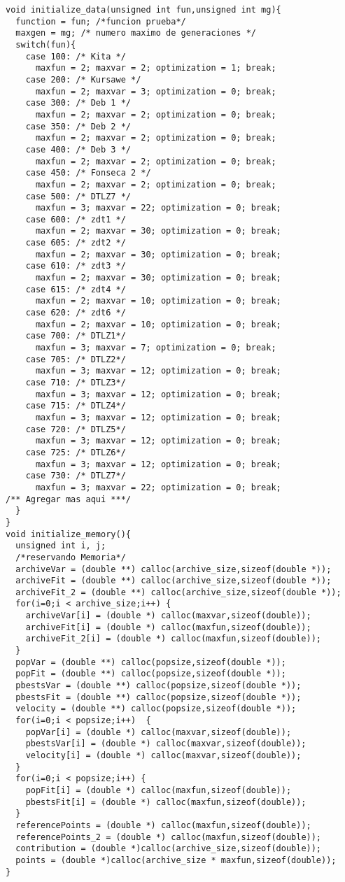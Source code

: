 \begin{lstlisting}[style=C]
void initialize_data(unsigned int fun,unsigned int mg){
  function = fun; /*funcion prueba*/
  maxgen = mg; /* numero maximo de generaciones */
  switch(fun){
    case 100: /* Kita */
      maxfun = 2; maxvar = 2; optimization = 1; break;
    case 200: /* Kursawe */
      maxfun = 2; maxvar = 3; optimization = 0; break;
    case 300: /* Deb 1 */
      maxfun = 2; maxvar = 2; optimization = 0; break;
    case 350: /* Deb 2 */
      maxfun = 2; maxvar = 2; optimization = 0; break;
    case 400: /* Deb 3 */
      maxfun = 2; maxvar = 2; optimization = 0; break;
    case 450: /* Fonseca 2 */
      maxfun = 2; maxvar = 2; optimization = 0; break;
    case 500: /* DTLZ7 */
      maxfun = 3; maxvar = 22; optimization = 0; break;
    case 600: /* zdt1 */
      maxfun = 2; maxvar = 30; optimization = 0; break;
    case 605: /* zdt2 */
      maxfun = 2; maxvar = 30; optimization = 0; break;
    case 610: /* zdt3 */
      maxfun = 2; maxvar = 30; optimization = 0; break;
    case 615: /* zdt4 */
      maxfun = 2; maxvar = 10; optimization = 0; break;
    case 620: /* zdt6 */
      maxfun = 2; maxvar = 10; optimization = 0; break;
    case 700: /* DTLZ1*/
      maxfun = 3; maxvar = 7; optimization = 0; break;
    case 705: /* DTLZ2*/
      maxfun = 3; maxvar = 12; optimization = 0; break;
    case 710: /* DTLZ3*/
      maxfun = 3; maxvar = 12; optimization = 0; break;
    case 715: /* DTLZ4*/
      maxfun = 3; maxvar = 12; optimization = 0; break;
    case 720: /* DTLZ5*/
      maxfun = 3; maxvar = 12; optimization = 0; break;
    case 725: /* DTLZ6*/
      maxfun = 3; maxvar = 12; optimization = 0; break;
    case 730: /* DTLZ7*/
      maxfun = 3; maxvar = 22; optimization = 0; break;
/** Agregar mas aqui ***/
  }
}
void initialize_memory(){
  unsigned int i, j;
  /*reservando Memoria*/
  archiveVar = (double **) calloc(archive_size,sizeof(double *));
  archiveFit = (double **) calloc(archive_size,sizeof(double *));
  archiveFit_2 = (double **) calloc(archive_size,sizeof(double *));
  for(i=0;i < archive_size;i++) {
    archiveVar[i] = (double *) calloc(maxvar,sizeof(double));
    archiveFit[i] = (double *) calloc(maxfun,sizeof(double));
    archiveFit_2[i] = (double *) calloc(maxfun,sizeof(double));	
  }
  popVar = (double **) calloc(popsize,sizeof(double *));
  popFit = (double **) calloc(popsize,sizeof(double *));
  pbestsVar = (double **) calloc(popsize,sizeof(double *));
  pbestsFit = (double **) calloc(popsize,sizeof(double *));
  velocity = (double **) calloc(popsize,sizeof(double *));
  for(i=0;i < popsize;i++)  {
    popVar[i] = (double *) calloc(maxvar,sizeof(double));
    pbestsVar[i] = (double *) calloc(maxvar,sizeof(double));
    velocity[i] = (double *) calloc(maxvar,sizeof(double));
  }
  for(i=0;i < popsize;i++) {
    popFit[i] = (double *) calloc(maxfun,sizeof(double));
    pbestsFit[i] = (double *) calloc(maxfun,sizeof(double));
  }
  referencePoints = (double *) calloc(maxfun,sizeof(double));
  referencePoints_2 = (double *) calloc(maxfun,sizeof(double));
  contribution = (double *)calloc(archive_size,sizeof(double));
  points = (double *)calloc(archive_size * maxfun,sizeof(double));  
}


\end{lstlisting}

